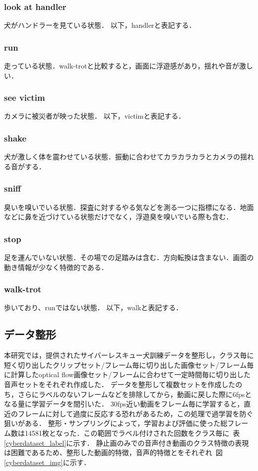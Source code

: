 \subsubsection{look at handler}
犬がハンドラーを見ている状態．
以下，handlerと表記する．
\subsubsection{run}
走っている状態．walk-trotと比較すると，画面に浮遊感があり，揺れや音が激しい．
\subsubsection{see victim}
カメラに被災者が映った状態．
以下，victimと表記する．
\subsubsection{shake}
犬が激しく体を震わせている状態．振動に合わせてカラカラカラとカメラの揺れる音がする．
\subsubsection{sniff}
臭いを嗅いでいる状態．探査に対するやる気などを測る一つに指標になる．地面などに鼻を近づけている状態だけでなく，浮遊臭を嗅いでいる際も含む．
\subsubsection{stop}
足を運んでいない状態．その場での足踏みは含む．方向転換は含まない．画面の動き情報が少なく特徴的である．
\subsubsection{walk-trot}
歩いており、runではない状態．
以下，walkと表記する．

\subsection{データ整形}
本研究では，提供されたサイバーレスキュー犬訓練データを整形し，クラス毎に短く切り出したクリップセット/フレーム毎に切り出した画像セット/フレーム毎に計算したoptical flow画像セット/フレームに合わせて一定時間毎に切り出した音声セットをそれぞれ作成した．
データを整形して複数セットを作成したのち，さらにラベルのないフレームなどを排除してから，動画に戻した際に6fpsとなる量に学習データを間引いた．
30fps近い動画をフレーム毎に学習すると，直近のフレームに対して過度に反応する恐れがあるため，この処理で過学習を防ぐ狙いがある．
整形・サンプリングによって，学習および評価に使った総フレーム数は14581枚となった．この範囲でラベル付けされた回数をクラス毎に~表\ref{cyberdataset_label}に示す．
静止画のみでの音声付き動画のクラス特徴の表現は困難であるため、整形した動画的特徴，音声的特徴とをそれぞれ~図\ref{cyberdataset_img}に示す．
